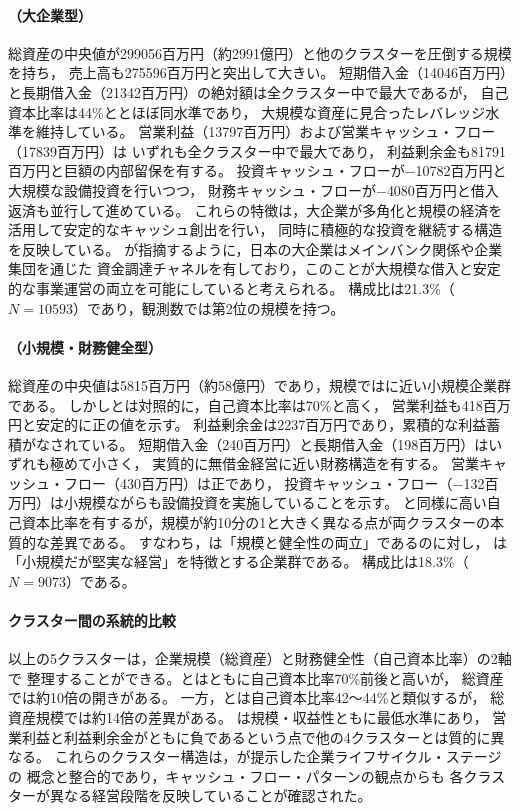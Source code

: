 \paragraph{（大企業型）}
総資産の中央値が\num{299056}百万円（約\num{2991}億円）と他のクラスターを圧倒する規模を持ち，
売上高も\num{275596}百万円と突出して大きい。
短期借入金（\num{14046}百万円）と長期借入金（\num{21342}百万円）の絶対額は全クラスター中で最大であるが，
自己資本比率は44\%ととほぼ同水準であり，
大規模な資産に見合ったレバレッジ水準を維持している。
営業利益（\num{13797}百万円）および営業キャッシュ・フロー（\num{17839}百万円）は
いずれも全クラスター中で最大であり，
利益剰余金も\num{81791}百万円と巨額の内部留保を有する。
投資キャッシュ・フローが$-$\num{10782}百万円と大規模な設備投資を行いつつ，
財務キャッシュ・フローが$-$\num{4080}百万円と借入返済も並行して進めている。
これらの特徴は，大企業が多角化と規模の経済を活用して安定的なキャッシュ創出を行い，
同時に積極的な投資を継続する構造を反映している。
が指摘するように，日本の大企業はメインバンク関係や企業集団を通じた
資金調達チャネルを有しており，このことが大規模な借入と安定的な事業運営の両立を可能にしていると考えられる。
構成比は21.3\%（$N=\num{10593}$）であり，観測数では第2位の規模を持つ。

\paragraph{（小規模・財務健全型）}
総資産の中央値は\num{5815}百万円（約58億円）であり，規模ではに近い小規模企業群である。
しかしとは対照的に，自己資本比率は70\%と高く，
営業利益も\num{418}百万円と安定的に正の値を示す。
利益剰余金は\num{2237}百万円であり，累積的な利益蓄積がなされている。
短期借入金（\num{240}百万円）と長期借入金（\num{198}百万円）はいずれも極めて小さく，
実質的に無借金経営に近い財務構造を有する。
営業キャッシュ・フロー（\num{430}百万円）は正であり，
投資キャッシュ・フロー（$-$\num{132}百万円）は小規模ながらも設備投資を実施していることを示す。
と同様に高い自己資本比率を有するが，規模が約10分の1と大きく異なる点が両クラスターの本質的な差異である。
すなわち，は「規模と健全性の両立」であるのに対し，
は「小規模だが堅実な経営」を特徴とする企業群である。
構成比は18.3\%（$N=\num{9073}$）である。

\paragraph{クラスター間の系統的比較}
以上の5クラスターは，企業規模（総資産）と財務健全性（自己資本比率）の2軸で
整理することができる。とはともに自己資本比率70\%前後と高いが，
総資産では約10倍の開きがある。
一方，とは自己資本比率42〜44\%と類似するが，
総資産規模では約14倍の差異がある。
は規模・収益性ともに最低水準にあり，
営業利益と利益剰余金がともに負であるという点で他の4クラスターとは質的に異なる。
これらのクラスター構造は，が提示した企業ライフサイクル・ステージの
概念と整合的であり，キャッシュ・フロー・パターンの観点からも
各クラスターが異なる経営段階を反映していることが確認された。

